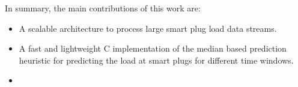 
In summary, the main contributions of this work are:

\begin{itemize}
 
 \item A scalable architecture to process large smart plug load data streams. 
 \item A fast and lightweight C implementation of the median based prediction heuristic for predicting the load at smart plugs for different time windows.
 \item 
\end{itemize}